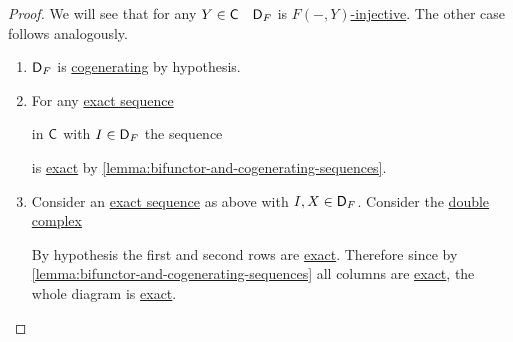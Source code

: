 \documentclass[../../main]{subfiles}
\begin{document}
\begin{proof}
  We will see that for any \(Y \in \mathsf{C} \quad  \mathsf{D}_{F}\) is \hyperref[def:F-injective-bifunctor]{\(F(-, Y)\)-injective}.
  The other case follows analogously.
  \begin{enumerate}
    \item \(\mathsf{D}_{F}\) is \hyperref[def:cogenerating-category]{cogenerating} by hypothesis.
    \item For any \hyperref[def:exact-sequence]{exact sequence}
          \begin{center}
          \end{center}
          in \(\mathsf{C}\) with \(I \in \mathsf{D}_{F}\) the sequence
          \begin{center}
          \end{center}
          is \hyperref[def:exact-sequence]{exact} by \autoref{lemma:bifunctor-and-cogenerating-sequences}.
    \item Consider an \hyperref[def:exact-sequence]{exact sequence} as above with \(I, X \in \mathsf{D}_{F}\).
          Consider the \hyperref[def:double-complex]{double complex}
          \begin{center}
          \end{center}
          By hypothesis the first and second rows are \hyperref[def:exact-sequence]{exact}.
          Therefore since by \autoref{lemma:bifunctor-and-cogenerating-sequences} all columns are \hyperref[def:exact-sequence]{exact}, the whole diagram is \hyperref[def:exact-complex]{exact}.
  \end{enumerate}
\end{proof}
\end{document}
